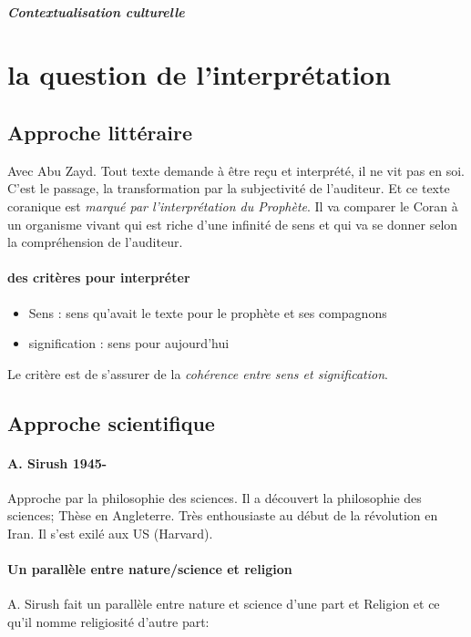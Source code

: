 \subparagraph{Contextualisation culturelle}

\section{la question de l'interprétation}

\subsection{Approche littéraire} 
Avec Abu Zayd.
Tout texte demande à être reçu et interprété, il ne vit pas en soi. C'est le passage, la transformation par la subjectivité de l'auditeur. Et ce texte coranique est \textit{marqué par l'interprétation du Prophète}. Il va comparer le Coran à un organisme vivant qui est riche d'une infinité de sens et qui va se donner selon la compréhension de l'auditeur.

\paragraph{des critères pour interpréter}


\begin{itemize}
    \item Sens : sens qu'avait le texte pour le prophète et ses compagnons
    \item signification : sens pour aujourd'hui
\end{itemize}
Le critère est de s'assurer de la \textit{cohérence entre sens et signification}. 


\subsection{Approche scientifique }

\paragraph{A. Sirush 1945-} Approche par la philosophie des sciences. Il a découvert la philosophie des sciences; Thèse en Angleterre. Très enthousiaste au début de la révolution en Iran. Il s'est exilé aux US (Harvard).

\paragraph{Un parallèle entre nature/science et religion} A. Sirush fait un parallèle entre nature et science d'une part et Religion et ce qu'il nomme religiosité d'autre part:
 
